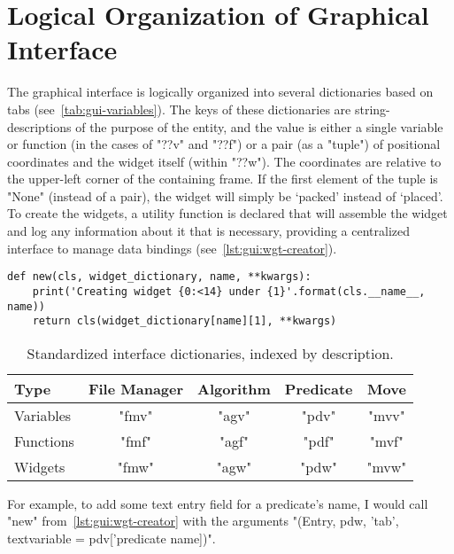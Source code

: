 \section{Logical Organization of Graphical Interface}
\label{sec:gui-org}

The graphical interface is logically organized into several dictionaries based on tabs
  (see~\autoref{tab:gui-variables}).
The keys of these dictionaries are string-descriptions of the purpose of the entity,
  and the value is either a single variable or function (in the cases of "??v" and "??f")
  or a pair (as a "tuple") of positional coordinates and the widget itself (within "??w").
The coordinates are relative to the upper-left corner of the containing frame.
If the first element of the tuple is "None" (instead of a pair),
  the widget will simply be \enquote*{packed} instead of \enquote*{placed}.
To create the widgets, a utility function is declared that will assemble the widget
  and log any information about it that is necessary,
  providing a centralized interface to manage data bindings (see~\autoref{lst:gui:wgt-creator}).

\begin{lstlisting}[float,caption={A standardized widget creator},label={lst:gui:wgt-creator}]
def new(cls, widget_dictionary, name, **kwargs):
    print('Creating widget {0:<14} under {1}'.format(cls.__name__, name))
    return cls(widget_dictionary[name][1], **kwargs)
\end{lstlisting}
\begin{table}
  \centering
  \begin{tabular}{lcccc}
    \toprule
    Type      & File Manager & Algorithm & Predicate & Move  \\ \midrule
    Variables & "fmv"        & "agv"     & "pdv"     & "mvv" \\
    Functions & "fmf"        & "agf"     & "pdf"     & "mvf" \\
    Widgets   & "fmw"        & "agw"     & "pdw"     & "mvw" \\
    \bottomrule
  \end{tabular}
  \caption{Standardized interface dictionaries, indexed by description.}
  \label{tab:gui-variables}
\end{table}

For example, to add some text entry field for a predicate's name,
  I would call "new" from~\autoref{lst:gui:wgt-creator} with the arguments
  "(Entry, pdw, 'tab', textvariable = pdv['predicate name])".

